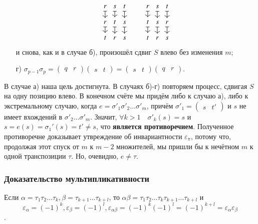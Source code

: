 \documentclass{article}
\begin{document}
\begin{enumerate}
\[    \]\[
    \begin{tikzcd}[column sep=0.5, row sep=small]
        r \dar[mapsto]	& s \dar[mapsto]	& t \dar[mapsto]	\\
        r \dar[mapsto]	& t \dar[mapsto]	& s \dar[mapsto]	\\
        t 				& r 				& s
    \end{tikzcd}
    \qquad
    \begin{tikzcd}[column sep=0.5, row sep=small]
    	r \dar[mapsto]	& s \dar[mapsto]	& t \dar[mapsto]	\\
    	t \dar[mapsto]	& s \dar[mapsto]	& r \dar[mapsto]	\\
    	t 				& r 				& s
    \end{tikzcd} \] и снова, как и в случае б), произошёл сдвиг $S$ влево без изменения $m$;
    \item[г)] $\sigma_{p-1}\sigma_p = (\begin{matrix}q&r\end{matrix})(\begin{matrix}s&t\end{matrix}) = (\begin{matrix}s&t\end{matrix})(\begin{matrix}q&r\end{matrix})$.
\end{enumerate}
В случае а) наша цель достигнута. В случаях б)-г) повторяем процесс, сдвигая $S$ на одну позицию влево. В конечном счёте мы придём либо к случаю а), либо к экстремальному случаю, когда $e = \sigma'_1\sigma'_2\dots\sigma'_m$, причём $\sigma'_1 = (\begin{matrix}s&t'\end{matrix})$ и $s$ не имеет вхождений в $\sigma'_2\dots\sigma'_m$. Значит, $\forall k>1 \quad \sigma'_k(s) = s$ и $s = e(s) = \sigma_1'(s) = t' \neq s$, что \textbf{является противоречием}. Полученное противоречне доказывает утвреждение об инвариантности $\varepsilon_\pi$, потому что, продолжая этот спуск от $m$ к $m-2$ множителей, мы пришли бы к нечётном $m$ к одной транспозиции $\tau$. Но, очевидно, $e \neq \tau$.

\subsubsection{Доказательство мультипликативности}
Если $\alpha = \tau_1\tau_2\dots\tau_k, \beta=\tau_{k+1}\dots\tau_{k+l}$, то $\alpha\beta = \tau_1\tau_2\dots\tau_k\tau_{k+1}\dots\tau_{k+l}$ и \[\varepsilon_\alpha = (-1)^k, \varepsilon_\beta = (-1)^l, \varepsilon_{\alpha\beta} = (-1)^k(-1)^l = (-1)^{k+l} = \varepsilon_\alpha\varepsilon_\beta\].
\end{document}
